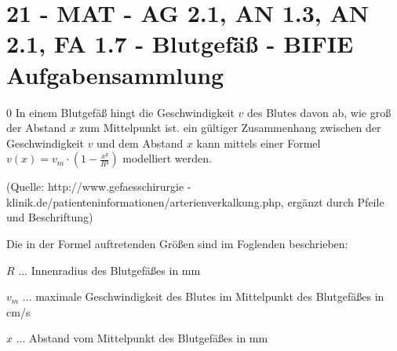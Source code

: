 \section{21 - MAT - AG 2.1, AN 1.3, AN 2.1, FA 1.7 - Blutgefäß - BIFIE Aufgabensammlung}

\begin{langesbeispiel} \item[0] %
				In einem Blutgefäß hingt die Geschwindigkeit $v$ des Blutes davon ab, wie groß der Abstand $x$ zum Mittelpunkt ist. ein gültiger Zusammenhang zwischen der Geschwindigkeit $v$ und dem Abstand $x$ kann mittels einer Formel $v(x)=v_m\cdot (1-\frac{x²}{R²})$ modelliert werden.
				
				\begin{center}\end{center}
				
				\begin{singlespace}
\begin{tiny}
(Quelle: http://www.gefaesschirurgie
-klinik.de/patienteninformationen/arterienverkalkung.php, ergänzt durch Pfeile und Beschriftung) 
\end{tiny}
\end{singlespace}

Die in der Formel auftretenden Größen sind im Foglenden beschrieben:\leer

$R$ ... Innenradius des Blutgefäßes in mm

$v_m$ ... maximale Geschwindigkeit des Blutes im Mittelpunkt des Blutgefäßes in cm/s

$x$ ... Abstand vom Mittelpunkt des Blutgefäßes in mm


\end{langesbeispiel}
